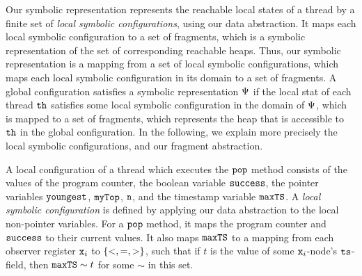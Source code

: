 %	


Our symbolic representation represents the reachable local states of a thread by
a finite set of {\em local symbolic configurations}, using our
data abstraction.
It maps each local symbolic configuration to a set of fragments, which
is a symbolic representation of the set of corresponding reachable heaps.
Thus, our symbolic representation is a mapping from a set of local symbolic
configurations, which maps each local symbolic configuration in its domain
to a set of fragments.
A global configuration satisfies a symbolic representation $\Psi$
if the local stat of each thread ${\tt th}$ satisfies some local symbolic
configuration in the domain of $\Psi$, which is mapped to a set
of fragments, which represents the heap that is accessible to ${\tt th}$ in
the global configuration. In the following, we explain more precisely the
local symbolic configurations, and our fragment abstraction.

A local configuration of a thread which executes the ${\tt pop}$ method consists
of the values of the program counter, the boolean variable ${\tt success}$, the
pointer variables ${\tt youngest}$, ${\tt myTop}$, ${\tt n}$,
and the timestamp variable ${\tt maxTS}$.
A {\em local symbolic configuration} is defined by applying our data abstraction
to the local non-pointer variables.  For a ${\tt pop}$ method, it maps
the program counter and ${\tt success}$ to their current values. It also maps
${\tt maxTS}$ to a mapping from each observer register $\mathtt{x}_i$
to $\left\{<,=,>\right\}$, such that if $t$ is the value of some $\mathtt{x}_i$-node's
$\tt ts$-field, then ${\tt maxTS} \sim t$ for some $\sim$ in this set.

